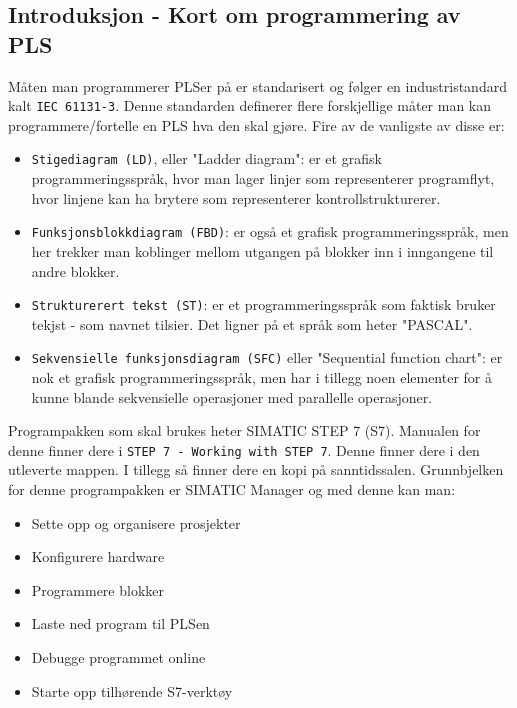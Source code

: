 \begin{alphasection}
\section{Introduksjon - Kort om programmering av PLS}

Måten man programmerer PLSer på er standarisert og følger en industristandard kalt \verb|IEC 61131-3|. Denne standarden definerer flere forskjellige måter man kan programmere/fortelle en PLS hva den skal gjøre. Fire av de vanligste av disse er:

\begin{itemize}
    \item \verb|Stigediagram (LD)|, eller "Ladder diagram": er et grafisk programmeringsspråk, hvor man lager linjer som representerer programflyt, hvor linjene kan ha brytere som representerer kontrollstrukturerer.
    
    \item \verb|Funksjonsblokkdiagram (FBD)|: er også et grafisk programmeringsspråk, men her trekker man koblinger mellom utgangen på blokker inn i inngangene til andre blokker. 
    \item \verb|Strukturerert tekst (ST)|: er et programmeringsspråk som faktisk bruker tekjst - som navnet tilsier. Det ligner på et språk som heter "PASCAL".
    
    \item \verb|Sekvensielle funksjonsdiagram (SFC)| eller "Sequential function chart": er nok et grafisk programmeringsspråk, men har i tillegg noen elementer for å kunne blande sekvensielle operasjoner med parallelle operasjoner.
\end{itemize}

Programpakken som skal brukes heter SIMATIC STEP 7 (S7). Manualen for denne finner dere i \verb|STEP 7 - Working with STEP 7|. Denne finner dere i den utleverte mappen. I tillegg så finner dere en kopi på sanntidssalen. Grunnbjelken for denne programpakken er SIMATIC Manager og med denne kan man: 

\begin{itemize}
    \item Sette opp og organisere prosjekter
    \item Konfigurere hardware
    \item Programmere blokker
    \item Laste ned program til PLSen
    \item Debugge programmet online
    \item Starte opp tilhørende S7-verktøy
\end{itemize}


\end{alphasection}
